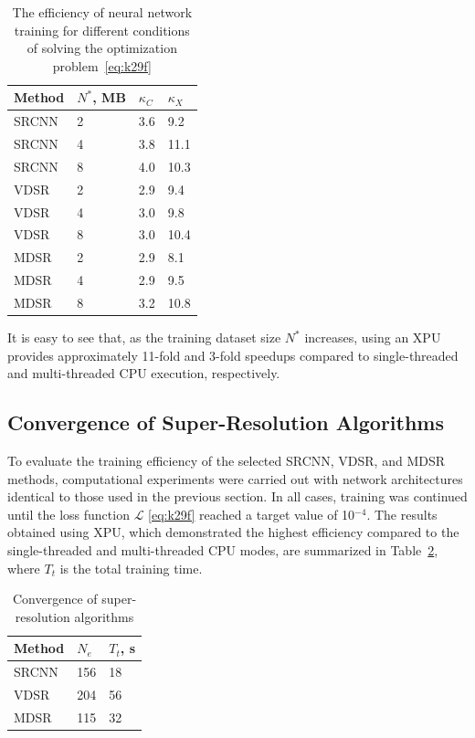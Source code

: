 \documentclass{ieeeaccess}
\begin{document}
\begin{table}[ht]
\caption{The efficiency of neural network training for different conditions of solving the optimization problem~\eqref{eq:k29f}}
\setlength{\tabcolsep}{3pt}
\begin{tabular}{|p{60pt}|p{50pt}|p{50pt}|p{50pt}|}
\hline
Method & $N^*$, MB & $\kappa_C$ & $\kappa_X$ \\
\hline
SRCNN & 2 & 3.6 & 9.2 \\
SRCNN & 4 & 3.8 & 11.1 \\
SRCNN & 8 & 4.0 & 10.3 \\
VDSR  & 2 & 2.9 & 9.4 \\
VDSR  & 4 & 3.0 & 9.8 \\
VDSR  & 8 & 3.0 & 10.4 \\
MDSR  & 2 & 2.9 & 8.1 \\
MDSR  & 4 & 2.9 & 9.5 \\
MDSR  & 8 & 3.2 & 10.8 \\
\hline
\end{tabular}
\label{tab:k4t}
\end{table}

It is easy to see that,  as the training dataset size $N^*$ increases, using an XPU provides approximately 11-fold and 3-fold speedups compared to single-threaded and multi-threaded CPU execution, respectively.

\subsection{Convergence of Super-Resolution Algorithms}

To evaluate the training efficiency of the selected SRCNN, VDSR, and MDSR methods, computational experiments were carried out with network architectures identical to those used in the previous section.  In all cases, training was continued until the loss function $\mathcal{L}$ \eqref{eq:k29f} reached a target value of 10$^{-4}$. The results obtained using XPU, which demonstrated the highest efficiency compared to the single-threaded and multi-threaded CPU modes, are summarized in Table~\ref{tab:k5t}, where $T_t$ is the total training time.
 
\begin{table}[ht]
\caption{Convergence of super-resolution algorithms} 
\setlength{\tabcolsep}{3pt}
\begin{tabular}{|p{60pt}|p{50pt}|p{50pt}|}
\hline
Method & $N_e$ & $T_t$, s \\
\hline
SRCNN & 156 & 18 \\
VDSR  & 204 & 56 \\
MDSR  & 115 & 32 \\
\hline
\end{tabular}
\label{tab:k5t}
\end{table}
\end{document}
